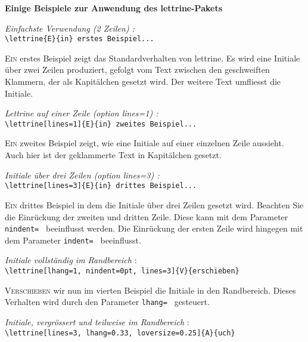 \documentclass[12pt,a4paper]{article}
\begin{document}
\thispagestyle{empty}

\begin{center}
\large\bfseries Einige Beispiele zur Anwendung des lettrine-Pakets
\end{center}

\vspace{\baselineskip}
\textit{Einfachste Verwendung (2 Zeilen) :}\\
\verb+\lettrine{E}{in} erstes Beispiel...+

\lettrine{E}{in} erstes Beispiel zeigt das Standardverhalten von lettrine.
Es wird eine Initiale \"uber zwei Zeilen produziert, gefolgt vom Text zwischen
den geschweiften Klammern, der als Kapit\"alchen gesetzt wird. Der weitere
Text umfliesst die Initiale.

\vspace{\baselineskip}
\textit{Lettrine auf einer Zeile (option {\ttfamily\upshape lines=1}) :}\\
\verb+\lettrine[lines=1]{E}{in} zweites Beispiel...+

\lettrine[lines=1]{E}{in} zweites Beispiel zeigt, wie eine Initiale auf
einer einzelnen Zeile aussieht. Auch hier ist der geklammerte Text in
Kapit\"alchen gesetzt.

\vspace{\baselineskip}
\textit{Initiale \"uber drei Zeilen (option {\ttfamily\upshape lines=3}) :}\\
\verb+\lettrine[lines=3]{E}{in} drittes Beispiel...+

\lettrine[lines=3]{E}{in} drittes Beispiel in dem die Initiale \"uber drei
Zeilen gesetzt wird. Beachten Sie die Einr\"uckung der zweiten und dritten
Zeile. Diese kann mit dem Parameter \verb+nindent= + beeinflusst werden. Die
Einr\"uckung der ersten Zeile wird hingegen mit dem Parameter \verb+indent= +
beeinflusst.

\vspace{\baselineskip}
\textit{Initiale vollst\"andig im Randbereich} :\\
\verb+\lettrine[lhang=1, nindent=0pt, lines=3]{V}{erschieben}+

\lettrine[lhang=1, nindent=0pt, lines=3]{V}{erschieben} wir nun im vierten
Beispiel die Initiale in den Randbereich. Dieses Verhalten wird durch den
Parameter \verb+lhang= + gesteuert.

\vspace{\baselineskip}
\textit{Initiale, vergr\"ossert und teilweise im Randbereich} :\\
\verb+\lettrine[lines=3, lhang=0.33, loversize=0.25]{A}{uch}+
\end{document}
